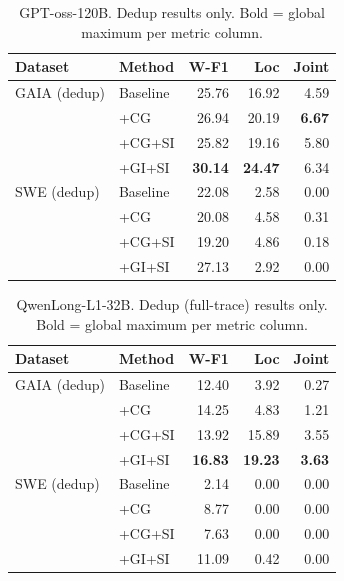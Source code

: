 \begin{table}[h]
\centering\small
\begin{tabular}{ll rrr}
\toprule
\textbf{Dataset} & \textbf{Method} & \textbf{W-F1} & \textbf{Loc} & \textbf{Joint} \\
\midrule
GAIA (dedup)  & Baseline  & 25.76 & 16.92 &  4.59 \\
              & +CG       & 26.94 & 20.19 & \textbf{6.67} \\
              & +CG+SI    & 25.82 & 19.16 &  5.80 \\
              & +GI+SI    & \textbf{30.14} & \textbf{24.47} &  6.34 \\
\midrule
SWE (dedup)   & Baseline  & 22.08 &  2.58 &  0.00 \\
              & +CG       & 20.08 &  4.58 &  0.31 \\
              & +CG+SI    & 19.20 &  4.86 &  0.18 \\
              & +GI+SI    & 27.13 &  2.92 &  0.00 \\
\bottomrule
\end{tabular}
\caption{GPT-oss-120B. Dedup results only.
  Bold = global maximum per metric column.}
\end{table}


\begin{table}[h]
\centering\small
\begin{tabular}{ll rrr}
\toprule
\textbf{Dataset} & \textbf{Method} & \textbf{W-F1} & \textbf{Loc} & \textbf{Joint} \\
\midrule
GAIA (dedup)   & Baseline  & 12.40 &  3.92 &  0.27 \\
               & +CG       & 14.25 &  4.83 &  1.21 \\
               & +CG+SI    & 13.92 & 15.89 &  3.55 \\
               & +GI+SI    & \textbf{16.83} & \textbf{19.23} & \textbf{3.63} \\
\midrule
SWE (dedup)    & Baseline  &  2.14 &  0.00 &  0.00 \\
               & +CG       &  8.77 &  0.00 &  0.00 \\
               & +CG+SI    &  7.63 &  0.00 &  0.00 \\
               & +GI+SI    & 11.09 &  0.42 &  0.00 \\
\bottomrule
\end{tabular}
\caption{QwenLong-L1-32B. Dedup (full-trace) results only.
  Bold = global maximum per metric column.}
\end{table}


